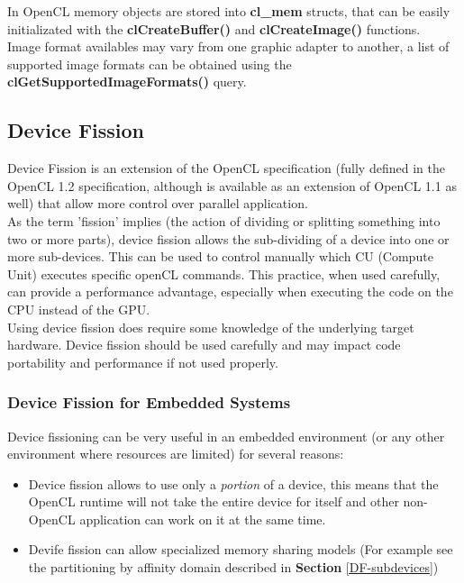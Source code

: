 \begin{CLCode}
In OpenCL memory objects are stored into \textbf{cl\_mem} structs, that can be easily initializated with the \textbf{clCreateBuffer()} and \textbf{clCreateImage()} functions.\\
Image format availables may vary from one graphic adapter to another, a list of supported image formats can be obtained using the \textbf{clGetSupportedImageFormats()} query.
\end{CLCode}





\subsection{Device Fission}

Device Fission is an extension of the OpenCL specification (fully defined in the OpenCL 1.2 specification, although is available as an extension of OpenCL 1.1 as well) that allow more control over parallel application.\\
As the term 'fission' implies (the action of dividing or splitting something into two or more parts), device fission allows the sub-dividing of a device into one or more sub-devices. This can be used to control manually which CU (Compute Unit) executes specific openCL commands. This practice, when used carefully, can provide a performance advantage, especially when executing the code on the CPU instead of the GPU.\cite{intel:12:DeviceFission}\\
Using device fission does require some knowledge of the underlying target hardware. Device fission should be used carefully and may impact code portability and performance if not used properly.

\subsubsection{Device Fission for Embedded Systems}
Device fissioning can be very useful in an embedded environment (or any other environment where resources are limited) for several reasons:

\begin{itemize}
	\item Device fission allows to use only a \emph{portion} of a device, this means that the OpenCL runtime will not take the entire device for itself and other non-OpenCL application can work on it at the same time.
	\item Devife fission can allow specialized memory sharing models (For example see the partitioning by affinity domain described in \textbf{Section} \ref{DF-subdevices})
\end{itemize}


